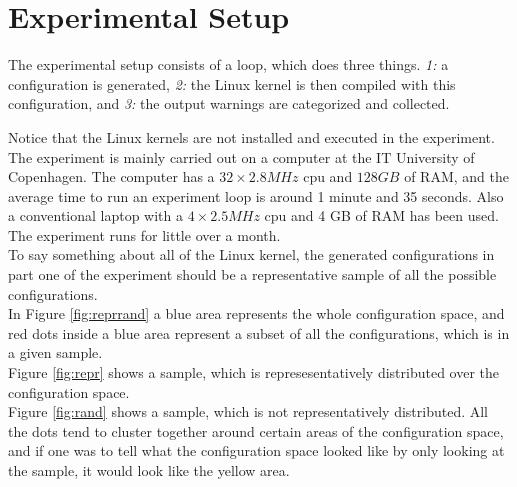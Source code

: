 \documentclass[a4paper,11pt]{report}
\begin{document}
            \section{Experimental Setup}
The experimental setup consists of a loop, which does three things. \emph{1:} a 
configuration is generated, \emph{2:} the Linux kernel is then compiled with 
this configuration, and \emph{3:} the output warnings are categorized and 
collected.

Notice that the Linux kernels are not installed and executed in the experiment.
\\

The experiment is mainly carried out on a computer at the IT University of 
Copenhagen. The computer has a $32\times2.8 MHz$ cpu and $128 GB$ of RAM, and 
the average time to run an experiment loop is around 1 minute and 35 seconds. 
Also a conventional laptop with a $4\times2.5 MHz$  cpu and 4 GB of RAM has 
been used. The experiment runs for little over a month.
\\


To say something about all of the Linux kernel, the generated configurations 
in part one of the experiment  should be a representative sample of all the 
possible configurations. 
\\


In Figure \ref{fig:reprrand} a blue area represents the whole configuration 
space, and red dots inside a blue area represent a subset of all the 
configurations, which is in a given sample.
\\

Figure \ref{fig:repr} shows a sample, which is represesentatively distributed 
over the configuration space. 
\\

Figure \ref{fig:rand} shows a sample, which is not representatively 
distributed. All the dots tend to cluster together around certain areas of the 
configuration space, and if one was to tell what the configuration space looked 
like by only looking at the sample, it would look like the yellow area.
\end{document}
